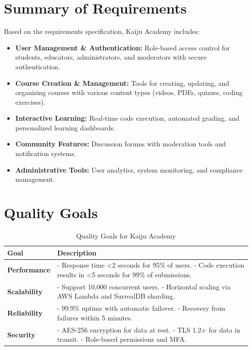 \documentclass[a4paper, 11pt]{scrreprt}
\begin{document}
\section{Summary of Requirements}
Based on the requirements specification, Kaiju Academy includes:

\begin{itemize}
    \item \textbf{User Management \& Authentication:} Role-based access control for students, educators, administrators, and moderators with secure authentication.
    
    \item \textbf{Course Creation \& Management:} Tools for creating, updating, and organizing courses with various content types (videos, PDFs, quizzes, coding exercises).
    
    \item \textbf{Interactive Learning:} Real-time code execution, automated grading, and personalized learning dashboards.
    
    \item \textbf{Community Features:} Discussion forums with moderation tools and notification systems.
    
    \item \textbf{Administrative Tools:} User analytics, system monitoring, and compliance management.
\end{itemize}

\section{Quality Goals}
\begin{table}[htp]
    \centering
    \begin{tabularx}{\textwidth}{|l|X|}
        \hline
        \textbf{Goal} & \textbf{Description} \\
        \hline
        \textbf{Performance} & - Response time <2 seconds for 95\% of users. \newline - Code execution results in <5 seconds for 99\% of submissions. \\
        \hline
        \textbf{Scalability} & - Support 10,000 concurrent users. \newline - Horizontal scaling via AWS Lambda and SurrealDB sharding. \\
        \hline
        \textbf{Reliability} & - 99.9\% uptime with automatic failover. \newline - Recovery from failures within 5 minutes. \\
        \hline
        \textbf{Security} & - AES-256 encryption for data at rest. \newline - TLS 1.2+ for data in transit. \newline - Role-based permissions and MFA. \\
        \hline
    \end{tabularx}
    \caption{Quality Goals for Kaiju Academy}
\end{table}
\end{document}
